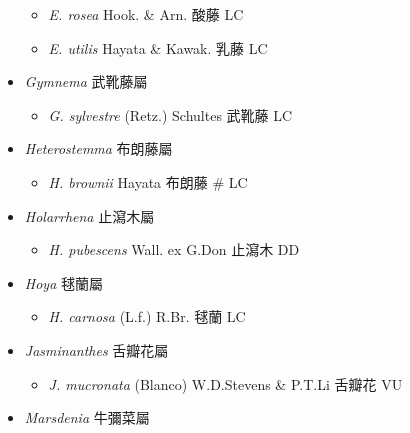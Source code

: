\begin{itemize}
  \begin{itemize}
        \item[] \textit{E. rosea} Hook. \& Arn.  酸藤   LC
        \item[] \textit{E. utilis} Hayata \& Kawak.  乳藤   LC
  \end{itemize}
 \item[] \textit{Gymnema} 武靴藤屬
                                
  \begin{itemize}
        \item[] \textit{G. sylvestre} (Retz.) Schultes  武靴藤   LC
  \end{itemize}
 \item[] \textit{Heterostemma} 布朗藤屬
                                
  \begin{itemize}
        \item[] \textit{H. brownii} Hayata  布朗藤  \# LC
  \end{itemize}
 \item[] \textit{Holarrhena} 止瀉木屬
                                
  \begin{itemize}
        \item[] \textit{H. pubescens} Wall. ex G.Don  止瀉木   DD
  \end{itemize}
 \item[] \textit{Hoya} 毬蘭屬
                                
  \begin{itemize}
        \item[] \textit{H. carnosa} (L.f.) R.Br.  毬蘭   LC
  \end{itemize}
 \item[] \textit{Jasminanthes} 舌瓣花屬
                                
  \begin{itemize}
        \item[] \textit{J. mucronata} (Blanco) W.D.Stevens \& P.T.Li  舌瓣花   VU
  \end{itemize}
 \item[] \textit{Marsdenia} 牛彌菜屬
                                

\end{itemize}
